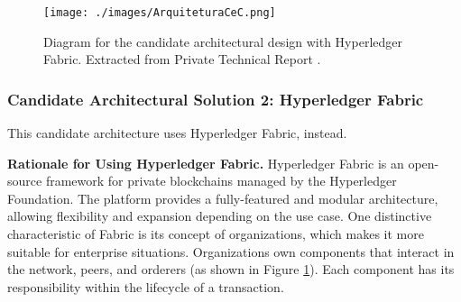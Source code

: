 
 \begin{figure}[!hbt]
  \centering
  \texttt{[image: ./images/ArquiteturaCeC.png]}
  \caption{Diagram for the candidate architectural design with Hyperledger Fabric. Extracted from Private Technical Report \cite{techReport}.}
  \label{fig:diagrama2}
\end{figure}


\subsubsection{Candidate Architectural Solution 2: Hyperledger Fabric}

This candidate architecture uses Hyperledger Fabric, instead.

\noindent\textbf{Rationale for Using Hyperledger Fabric.} Hyperledger Fabric is an open-source framework for private blockchains managed by the Hyperledger Foundation. The platform provides a fully-featured and modular architecture, allowing flexibility and expansion depending on the use case. One distinctive characteristic of Fabric is its concept of organizations, which makes it more suitable for enterprise situations. Organizations own components that interact in the network, peers, and orderers (as shown in Figure \ref{fig:diagrama2}). Each component has its responsibility within the lifecycle of a transaction. \cite{fabric-article}

